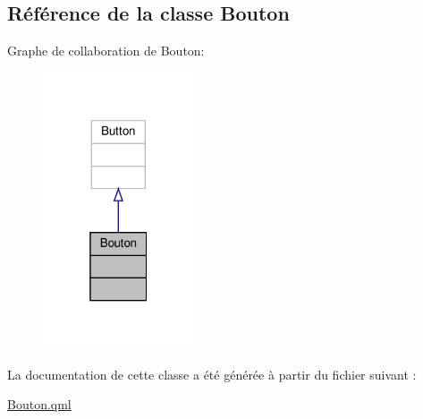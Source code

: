 \hypertarget{class_bouton}{}\subsection{Référence de la classe Bouton}
\label{class_bouton}


Graphe de collaboration de Bouton\+:\nopagebreak
\begin{figure}[H]
\begin{center}
\leavevmode
\includegraphics[width=127pt]{class_bouton__coll__graph}
\end{center}
\end{figure}


La documentation de cette classe a été générée à partir du fichier suivant \+:\begin{DoxyCompactItemize}
\item 
\hyperlink{_bouton_8qml}{Bouton.\+qml}\end{DoxyCompactItemize}
